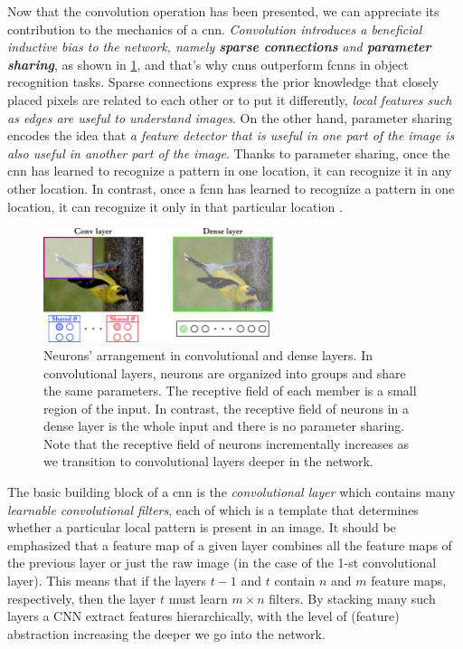 Now that the convolution operation has been presented, we can appreciate its
contribution to the mechanics of a \gls{cnn}. \emph{Convolution introduces a
beneficial inductive bias to the network, namely \textbf{sparse
connections} and \textbf{parameter
sharing}}, as shown in \Figure{}
\ref{fig:convolution_dense}, and that's why \glspl{cnn} outperform \glspl{fcnn}
in object recognition tasks. Sparse connections
express the prior knowledge that closely placed pixels are related to each other
or to put it differently, \emph{local features such as edges are useful to
understand images}. On the other hand, parameter sharing encodes the idea that
\emph{a feature detector that is useful in one part of the image is also useful
in another part of the image}. Thanks to parameter sharing, once the \gls{cnn}
has learned to recognize a pattern in one location, it can recognize it in any
other location. In contrast, once a \gls{fcnn} has learned to recognize a
pattern in one location, it can recognize it only in that particular location
\parencite{ml}.

\begin{figure}
	\centering
	\includegraphics[width=0.6\textwidth]{fig/convolution_dense.pdf}
	\caption[Neurons' arrangement in convolutional and dense layers.]{Neurons'
	arrangement in convolutional and dense layers. In convolutional layers,
	neurons are organized into groups and share the same parameters. The
	receptive field of each member is a small region of the input. In contrast,
	the receptive field of neurons in a dense layer is the whole input and there
	is no parameter sharing. Note that the receptive field of neurons
	incrementally increases as we transition to convolutional layers deeper in
	the network.}
	\label{fig:convolution_dense}
\end{figure}

The basic building block of a \gls{cnn} is the \emph{convolutional
layer} which contains many \emph{learnable
convolutional filters}, each of which is a template
that determines whether a particular local pattern is present in an image.
It should be emphasized that a feature map of a given layer combines all the
feature maps of the previous layer or just the raw image (in the case of the
1-st convolutional layer). This means that if the layers $t-1$ and $t$ contain
$n$ and $m$ feature maps, respectively, then the layer $t$ must learn $m\times
n$ filters. By stacking many such layers a CNN extract features hierarchically,
with the level of (feature) abstraction increasing the deeper we go into the
network.

